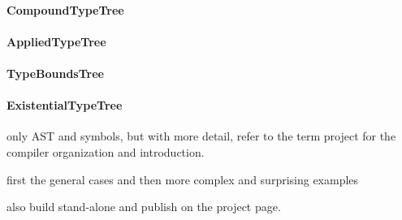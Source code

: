 \paragraph{CompoundTypeTree} 

\paragraph{AppliedTypeTree} 

\paragraph{TypeBoundsTree} 

\paragraph{ExistentialTypeTree} 




only AST and symbols, but with more detail, refer to the term project for the compiler organization and introduction.

first the general cases and then more complex and surprising examples

also build stand-alone and publish on the project page.
